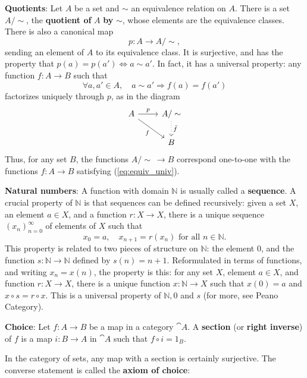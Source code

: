 \documentclass[11pt,a4paper]{article}
\begin{document}
\bigskip\noindent\textbf{Quotients}: Let $A$ be a set and $\sim$ an equivalence relation on $A$. There is a set $A/\sim$, the \textbf{quotient of} $A$ \textbf{by} $\sim$, whose elements are the equivalence classes. There is also a canonical map
\begin{equation*}
    p: A\to A/\sim,
\end{equation*}
sending an element of $A$ to its equivalence class. It is surjective, and has the property that $p(a)=p(a') \Longleftrightarrow a\sim a'$. In fact, it has a universal property: any function $f:A\to B$ such that
\begin{equation}\label{eq:equiv_univ}
    \forall a,a'\in A, \quad a\sim a' \Rightarrow f(a)=f(a')
\end{equation}
factorizes uniquely through $p$, as in the diagram
\begin{equation*}
\begin{tikzcd}
    A \arrow[r, "p"] \arrow[dr, "f"'] & A/\sim \arrow[d, dotted, "\bar{f}"] \\
    & B
\end{tikzcd}
\end{equation*}
Thus, for any set $B$, the functions $A/\sim\ \to B$ correspond one-to-one with the functions $f:A\to B$ satisfying (\ref{eq:equiv_univ}).\par

\bigskip\noindent\textbf{Natural numbers}: A function with domain $\mathbb{N}$ is usually called a \textbf{sequence}. A crucial property of $\mathbb{N}$ is that sequences can be defined recursively: given a set $X$, an element $a\in X$, and a function $r:X\to X$, there is a unique sequence $(x_n)_{n=0}^{\infty}$ of elements of $X$ such that
\begin{equation*}
    x_0=a,\quad x_{n+1}=r(x_n) \text{ for all } n\in\mathbb{N}.
\end{equation*}
This property is related to two pieces of structure on $\mathbb{N}$: the element $0$, and the function $s:\mathbb{N}\to\mathbb{N}$ defined by $s(n)=n+1$. Reformulated in terms of functions, and writing $x_n=x(n)$, the property is this: for any set $X$, element $a\in X$, and function $r:X\to X$, there is a unique function $x:\mathbb{N}\to X$ such that $x(0)=a$ and $x\circ s=r\circ x$. This is a universal property of $\mathbb{N}, 0$ and $s$ (for more, see Peano Category).\par

\bigskip\noindent\textbf{Choice}: Let $f:A\to B$ be a map in a category $\cat{A}$. A \textbf{section} (or \textbf{right inverse}) of $f$ is a map $i: B\to A$ in $\cat{A}$ such that $f\circ i=1_B$.\par
In the category of sets, any map with a section is certainly surjective. The converse statement is called the \textbf{axiom of choice}:
\end{document}
